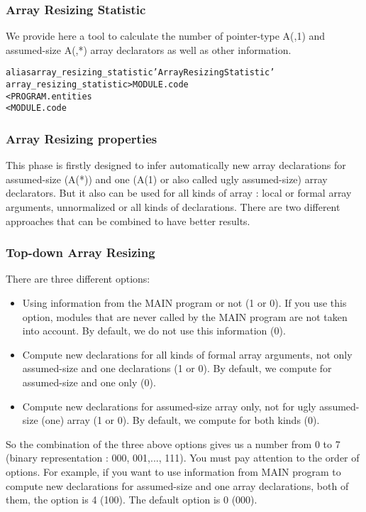 \documentclass[a4paper]{report}
\newenvironment{PipsMake}{\begin{alltt}}{\end{alltt}}
\begin{document}
\subsubsection{Array Resizing Statistic}

We provide here a tool to calculate the number of pointer-type A(,1) and
assumed-size A(,*) array declarators as well as other information.

\begin{PipsMake}
alias array_resizing_statistic 'Array Resizing Statistic'
array_resizing_statistic   > MODULE.code
        < PROGRAM.entities
        < MODULE.code
\end{PipsMake}

\subsubsection{Array Resizing properties}

This phase is firstly designed to infer automatically new array
declarations for assumed-size (A(*)) and one (A(1) or also called ugly
assumed-size) array declarators. But
it also can be used for all kinds of array : local or formal array
arguments, unnormalized or all kinds of declarations. There are two
different approaches that can be combined to have better results.

\subsubsection*{Top-down Array Resizing}
There are three different options:
\begin{itemize}
\item Using information from the MAIN program or not (1 or 0). If you use
  this option, modules that are never called by the MAIN program are not
  taken into account. By default, we do not use this information (0).
\item Compute new declarations for all kinds of formal array arguments,
  not only assumed-size and one declarations (1 or 0). By default, we
  compute for assumed-size and one only (0).
\item Compute new declarations for assumed-size array only, not for ugly
  assumed-size (one) array (1 or 0). By default, we compute for both kinds
  (0).
\end{itemize}
So the combination of the three above options gives us a number from 0 to
7 (binary representation : 000, 001,..., 111). You must pay attention to
the order of options. For example, if you want to use information from
MAIN program to compute new declarations for assumed-size and one array
declarations, both of them, the option is 4 (100). The default option is 0
(000).
\end{document}
